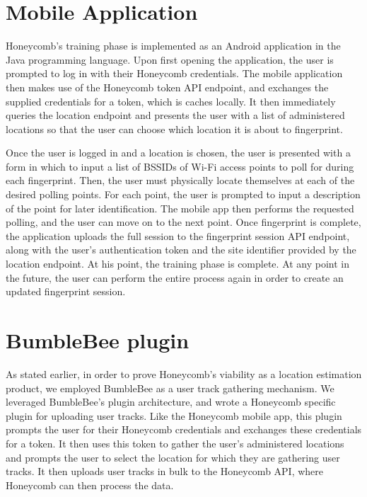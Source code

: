 \section{Mobile Application}
%

Honeycomb's training phase is implemented as an Android application in the Java programming language. Upon first opening the application, the user is prompted to log in with their Honeycomb credentials. The mobile application then makes use of the Honeycomb token API endpoint, and exchanges the supplied credentials for a token, which is caches locally. It then immediately queries the location endpoint and presents the user with a list of administered locations so that the user can choose which location it is about to fingerprint. 

Once the user is logged in and a location is chosen, the user is presented with a form in which to input a list of BSSIDs of Wi-Fi access points to poll for during each fingerprint. Then, the user must physically locate themselves at each of the desired polling points. For each point, the user is prompted to input a description of the point for later identification. The mobile app then performs the requested polling, and the user can move on to the next point. Once fingerprint is complete, the application uploads the full session to the fingerprint session API endpoint, along with the user's authentication token and the site identifier provided by the location endpoint. At his point, the training phase is complete. At any point in the future, the user can perform the entire process again in order to create an updated fingerprint session.


\section{BumbleBee plugin}
%


As stated earlier, in order to prove Honeycomb's viability as a location estimation product, we employed BumbleBee as a user track gathering mechanism. We leveraged BumbleBee's plugin architecture, and wrote a Honeycomb specific plugin for uploading user tracks. Like the Honeycomb mobile app, this plugin prompts the user for their Honeycomb credentials and exchanges these credentials for a token. It then uses this token to gather the user's administered locations and prompts the user to select the location for which they are gathering user tracks. It then uploads user tracks in bulk to the Honeycomb API, where Honeycomb can then process the data.